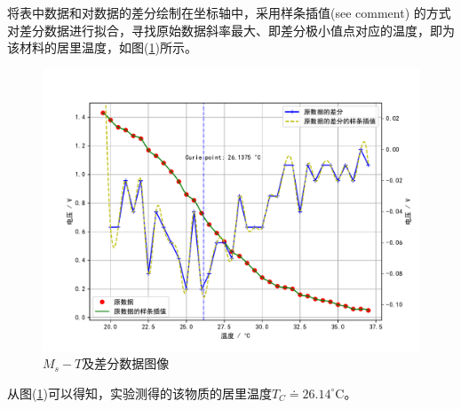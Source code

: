 \documentclass[a4paper]{article}
\begin{document}
将表中数据和对数据的差分绘制在坐标轴中，采用样条插值(see comment) %
的方式对差分数据进行拟合，寻找原始数据斜率最大、即差分极小值点对应的温度，即为该材料的居里温度，如图(\ref{data:fig})所示。
\begin{figure}[!h]
\centering
\includegraphics[width=\textwidth]{fig/data.pdf}
\caption{$M_s - T$及差分数据图像}\label{data:fig}
\end{figure}

从图(\ref{data:fig})可以得知，实验测得的该物质的居里温度$T_C\doteq 26.14 ^{\circ}$C。
\end{document}
